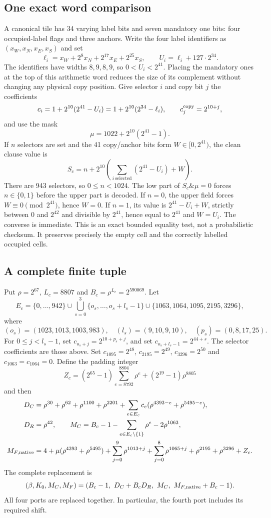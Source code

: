 \documentclass[11pt,letterpaper]{article}
\theoremstyle{definition}\newtheorem{definition}[theorem]{Definition}
\theoremstyle{remark}\newtheorem{remark}[theorem]{Remark}
\begin{document}
\subsection{One exact word comparison}

A canonical tile has 34 varying label bits and seven mandatory one bits: four occupied-label flags and three anchors. Write the four label identifiers as $(x_W,x_N,x_E,x_S)$ and set
\[
 \ell_i=x_W+2^8x_N+2^{17}x_E+2^{25}x_S,
 \qquad U_i=\ell_i+127\cdot2^{34}.
\]
The identifiers have widths $8,9,8,9$, so $0<U_i<2^{41}$. Placing the mandatory ones at the top of this arithmetic word reduces the size of its complement without changing any physical copy position. Give selector $i$ and copy bit $j$ the coefficients
\[
 c_i=1+2^{10}(2^{41}-U_i)=1+2^{10}(2^{34}-\ell_i),
 \qquad c^{\rm copy}_j=2^{10+j},
\]
and use the mask
\[
 \mu=1022+2^{10}(2^{41}-1).
\]
If $n$ selectors are set and the 41 copy/anchor bits form $W\in[0,2^{41})$, the clean clause value is
\[
 S_c=n+2^{10}\left(\sum_{i\ \mathrm{selected}}(2^{41}-U_i)+W\right).
\]
There are 943 selectors, so $0\le n<1024$. The low part of $S_c\mathbin{\&}\mu=0$ forces $n\in\{0,1\}$ before the upper part is decoded. If $n=0$, the upper field forces $W\equiv0\pmod{2^{41}}$, hence $W=0$. If $n=1$, its value is $2^{41}-U_i+W$, strictly between 0 and $2^{42}$ and divisible by $2^{41}$, hence equal to $2^{41}$ and $W=U_i$. The converse is immediate. This is an exact bounded equality test, not a probabilistic checksum. It preserves precisely the empty cell and the correctly labelled occupied cells.

\subsection{A complete finite tuple}

Put $\rho=2^{67}$, $L_c=8807$ and $B_c=\rho^{L_c}=2^{590069}$. Let
\[
 E_c=\{0,\ldots,942\}\cup\bigcup_{s=0}^3\{o_s,\ldots,o_s+l_s-1\}
       \cup\{1063,1064,1095,2195,3296\},
\]
where
\[
 (o_s)=(1023,1013,1003,983),\quad(l_s)=(9,10,9,10),\quad(p_s)=(0,8,17,25).
\]
For $0\le j<l_s-1$, set $c_{o_s+j}=2^{10+p_s+j}$, and set
$c_{o_s+l_s-1}=2^{44+s}$. The selector coefficients are those above. Set
$c_{1095}=2^{48}$, $c_{2195}=2^{49}$, $c_{3296}=2^{50}$ and $c_{1063}=c_{1064}=0$. Define the padding integer
\[
 Z_c=(2^{65}-1)\sum_{e=8792}^{8804}\rho^e+(2^{19}-1)\rho^{8805}
\]
and then
\begin{align*}
 D_C&=\rho^{30}+\rho^{62}+\rho^{1100}+\rho^{2201}
        +\sum_{e\in E_c}c_e(\rho^{4393-e}+\rho^{5495-e}),\\
 D_R&=\rho^{42},\qquad
 M_C=B_c-1-\sum_{e\in E_c\setminus\{1\}}\rho^e-2\rho^{1063},\\
 M_{F,\rm native}&=4+\mu(\rho^{4393}+\rho^{5495})
       +\sum_{j=0}^9\rho^{1013+j}+\sum_{j=0}^8\rho^{1065+j}
       +\rho^{2195}+\rho^{3296}+Z_c.
\end{align*}
The complete replacement is
\[
 (\beta,K_0,M_C,M_F)=(B_c-1,\ D_C+B_cD_R,\ M_C,\ M_{F,\rm native}+B_c-1).
\]
All four ports are replaced together. In particular, the fourth port includes its required shift.
\end{document}
